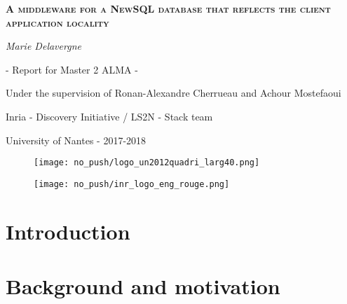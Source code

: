 \documentclass[a4paper, 10pt, titlepage]{report}
\begin{document}
%
\begin{titlepage}
	\centering
	{\scshape\LARGE\bfseries A middleware for a NewSQL database that reflects the client application locality \par}
	\vspace{0cm}
	{\Large\itshape Marie Delavergne\par}
        {\Large - Report for Master 2 ALMA -\par}

	\vfill


        {\large Under the supervision of Ronan-Alexandre Cherrueau and Achour Mostefaoui \par}
        {\large Inria - Discovery Initiative / LS2N - Stack team\par}
	{\large University of Nantes - 2017-2018 \par}

\begin{figure}[!h]\centering
   \begin{minipage}{0.3\textwidth}
     \centerline{\texttt{[image: no\_push/logo\_un2012quadri\_larg40.png]}}
     \label{Fig:univnantes}
   \end{minipage}
   \begin {minipage}{0.3\textwidth}
     \centerline{\texttt{[image: no\_push/inr\_logo\_eng\_rouge.png]}}
     \label{Fig:inria}
   \end{minipage}
\end{figure}



\end{titlepage}


\clearpage
\tableofcontents
\newpage

\chapter*{Introduction}




\chapter{Background and motivation}



\end{document}
